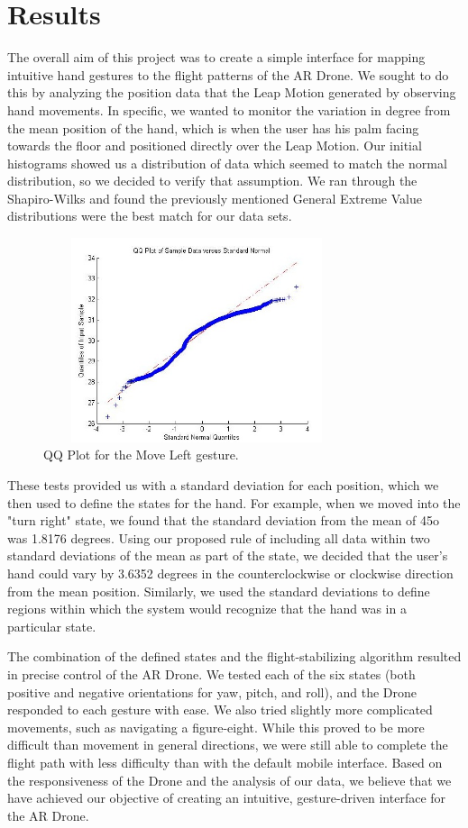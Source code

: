 \documentclass[letterpaper,english, 12pt]{article}
\begin{document}
\section*{Results}

The overall aim of this project was to create a simple interface for mapping intuitive hand gestures to the flight patterns of the AR Drone. We sought to do this by analyzing the position data that the Leap Motion generated by observing hand movements. In specific, we wanted to monitor the variation in degree from the mean position of the hand, which is when the user has his palm facing towards the floor and positioned directly over the Leap Motion. Our initial histograms showed us a distribution of data which seemed to match the normal distribution, so we decided to verify that assumption. We ran through the Shapiro-Wilks and found the previously mentioned General Extreme Value distributions were the best match for our data sets.

\begin{figure}[H]
	\centering
	\includegraphics[height=6cm,width=90mm]{pics/qqLeft.jpg}
	\caption{QQ Plot for the Move Left gesture.}
\end{figure}

These tests provided us with a standard deviation for each position, which we then used to define the states for the hand. For example, when we moved into the "turn right" state, we found that the standard deviation from the mean of 45o was 1.8176 degrees. Using our proposed rule of including all data within two standard deviations of the mean as part of the state, we decided that the user's hand could vary by 3.6352 degrees in the counterclockwise or clockwise direction from the mean position. Similarly, we used the standard deviations to define regions within which the system would recognize that the hand was in a particular state.

The combination of the defined states and the flight-stabilizing algorithm resulted in precise control of the AR Drone. We tested each of the six states (both positive and negative orientations for yaw, pitch, and roll), and the Drone responded to each gesture with ease. We also tried slightly more complicated movements, such as navigating a figure-eight. While this proved to be more difficult than movement in general directions, we were still able to complete the flight path with less difficulty than with the default mobile interface. Based on the responsiveness of the Drone and the analysis of our data, we believe that we have achieved our objective of creating an intuitive, gesture-driven interface for the AR Drone.
\end{document}
